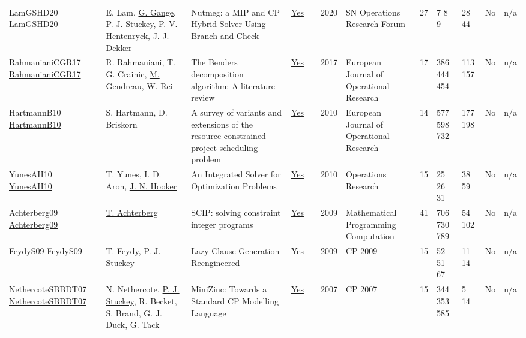 {\begin{longtable}{>{\raggedright\arraybackslash}p{3cm}>{\raggedright\arraybackslash}p{4.5cm}>{\raggedright\arraybackslash}p{6.0cm}rrrp{2.5cm}rp{1cm}p{1cm}rr}
LamGSHD20 \href{http://dx.doi.org/10.1007/s43069-020-00023-2}{LamGSHD20} & E. Lam, \hyperref[auth:a185]{G. Gange}, \hyperref[auth:a125]{P. J. Stuckey}, \hyperref[auth:a148]{P. V. Hentenryck}, J. J. Dekker & \cellcolor{gold!20}Nutmeg: a MIP and CP Hybrid Solver Using Branch-and-Check & \href{../works/LamGSHD20.pdf}{Yes} & \cite{LamGSHD20} & 2020 & SN Operations Research Forum & 27 & 7 8 9 & 28 44 & No & n/a\\
RahmanianiCGR17 \href{http://dx.doi.org/10.1016/j.ejor.2016.12.005}{RahmanianiCGR17} & R. Rahmaniani, T. G. Crainic, \hyperref[auth:a616]{M. Gendreau}, W. Rei & The Benders decomposition algorithm: A literature review & \href{../works/RahmanianiCGR17.pdf}{Yes} & \cite{RahmanianiCGR17} & 2017 & European Journal of Operational Research & 17 & 386 444 454 & 113 157 & No & n/a\\
HartmannB10 \href{http://dx.doi.org/10.1016/j.ejor.2009.11.005}{HartmannB10} & S. Hartmann, D. Briskorn & \cellcolor{green!10}A survey of variants and extensions of the resource-constrained project scheduling problem & \href{../works/HartmannB10.pdf}{Yes} & \cite{HartmannB10} & 2010 & European Journal of Operational Research & 14 & 577 598 732 & 177 198 & No & n/a\\
YunesAH10 \href{http://dx.doi.org/10.1287/opre.1090.0733}{YunesAH10} & T. Yunes, I. D. Aron, \hyperref[auth:a160]{J. N. Hooker} & An Integrated Solver for Optimization Problems & \href{../works/YunesAH10.pdf}{Yes} & \cite{YunesAH10} & 2010 & Operations Research & 15 & 25 26 31 & 38 59 & No & n/a\\
Achterberg09 \href{http://dx.doi.org/10.1007/s12532-008-0001-1}{Achterberg09} & \hyperref[auth:a1045]{T. Achterberg} & SCIP: solving constraint integer programs & \href{../works/Achterberg09.pdf}{Yes} & \cite{Achterberg09} & 2009 & Mathematical Programming Computation & 41 & 706 730 789 & 54 102 & No & n/a\\
FeydyS09 \href{https://doi.org/10.1007/978-3-642-04244-7_29}{FeydyS09} & \hyperref[auth:a154]{T. Feydy}, \hyperref[auth:a125]{P. J. Stuckey} & Lazy Clause Generation Reengineered & \href{../works/FeydyS09.pdf}{Yes} & \cite{FeydyS09} & 2009 & CP 2009 & 15 & 52 51 67 & 11 14 & No & n/a\\
NethercoteSBBDT07 \href{https://doi.org/10.1007/978-3-540-74970-7_38}{NethercoteSBBDT07} & N. Nethercote, \hyperref[auth:a125]{P. J. Stuckey}, R. Becket, S. Brand, G. J. Duck, G. Tack & MiniZinc: Towards a Standard {CP} Modelling Language & \href{../works/NethercoteSBBDT07.pdf}{Yes} & \cite{NethercoteSBBDT07} & 2007 & CP 2007 & 15 & 344 353 585 & 5 14 & No & n/a\\

\end{longtable}}
